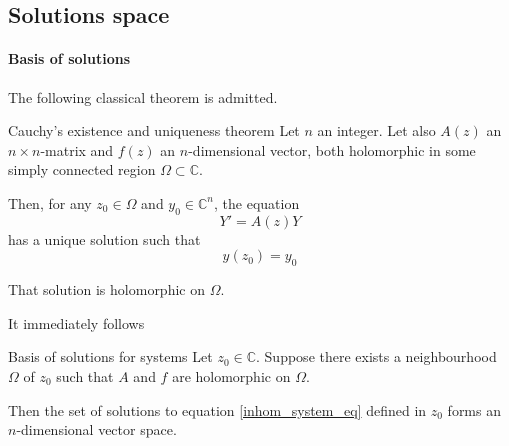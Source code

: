 \documentclass[../main.tex]{subfiles}
\begin{document}
\subsection{Solutions space}

\paragraph{Basis of solutions}

The following classical theorem is admitted.

\begin{thm}{Cauchy's existence and uniqueness theorem}\label{thm_cauchy}
	Let $n$ an integer. Let also $A(z)$ an $n \times n$-matrix and $f(z)$ an $n$-dimensional vector, both holomorphic in some simply connected region $\Omega \subset \mathbb{C}$.
	
	Then, for any $z_0 \in \Omega$ and $y_0 \in \mathbb{C}^n$, the equation
	\begin{equation}\label{inhom_system_eq}
	Y' = A(z) Y
	\end{equation}
	has a unique solution such that
	\begin{equation*}
		y(z_0) = y_0
	\end{equation*}
	
	That solution is holomorphic on $\Omega$.
\end{thm}

It immediately follows

\begin{cor}{Basis of solutions for systems}
	Let $z_0 \in \mathbb{C}$. Suppose there exists a neighbourhood $\Omega$ of $z_0$ such that $A$ and $f$ are holomorphic on $\Omega$.
	
	Then the set of solutions to equation \eqref{inhom_system_eq} defined in $z_0$ forms an $n$-dimensional vector space. 
\end{cor}
\end{document}
